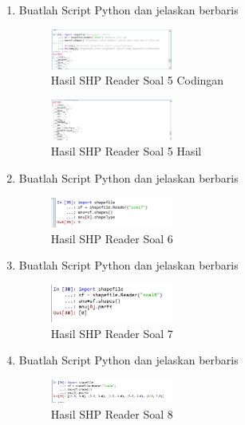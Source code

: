 \begin{enumerate}
    \item Buatlah Script Python dan jelaskan berbaris
    
    \hfill\break
    \begin{figure}[H]
		\includegraphics[width=4cm]{figures/1174095/3/51.png}
		\centering
		\caption{Hasil SHP Reader Soal 5 Codingan}
    \end{figure}

    \hfill\break
    \begin{figure}[H]
		\includegraphics[width=4cm]{figures/1174095/3/5.png}
		\centering
		\caption{Hasil SHP Reader Soal 5 Hasil}
    \end{figure}
    
    \item Buatlah Script Python dan jelaskan berbaris
    
    \hfill\break
    \begin{figure}[H]
		\includegraphics[width=4cm]{figures/1174095/3/6.png}
		\centering
		\caption{Hasil SHP Reader Soal 6}
    \end{figure}

    \item Buatlah Script Python dan jelaskan berbaris
    
    \hfill\break
    \begin{figure}[H]
		\includegraphics[width=4cm]{figures/1174095/3/7.png}
		\centering
		\caption{Hasil SHP Reader Soal 7}
    \end{figure}

    \item Buatlah Script Python dan jelaskan berbaris
    
    \hfill\break
    \begin{figure}[H]
		\includegraphics[width=4cm]{figures/1174095/3/8.png}
		\centering
		\caption{Hasil SHP Reader Soal 8}
    \end{figure}


\end{enumerate}
